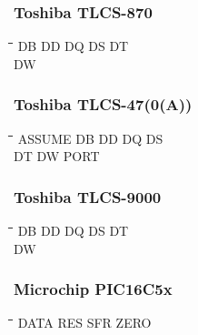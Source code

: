 \subsubsection{Toshiba TLCS-870}
{\tt\begin{tabbing}
\hspace{3cm}\=\hspace{3cm}\=\hspace{3cm}\=\hspace{3cm}\=\kill
DB         \> DD          \> DQ          \> DS          \> DT \\
DW \\
\end{tabbing}}

\subsubsection{Toshiba TLCS-47(0(A))}
{\tt\begin{tabbing}
\hspace{3cm}\=\hspace{3cm}\=\hspace{3cm}\=\hspace{3cm}\=\kill
ASSUME     \> DB          \> DD          \> DQ          \> DS \\
DT         \> DW          \> PORT \\
\end{tabbing}}

\subsubsection{Toshiba TLCS-9000}
{\tt\begin{tabbing}
\hspace{3cm}\=\hspace{3cm}\=\hspace{3cm}\=\hspace{3cm}\=\kill
DB         \> DD          \> DQ          \> DS          \> DT \\
DW \\
\end{tabbing}}

\subsubsection{Microchip PIC16C5x}
{\tt\begin{tabbing}
\hspace{3cm}\=\hspace{3cm}\=\hspace{3cm}\=\hspace{3cm}\=\kill
DATA       \> RES         \> SFR         \> ZERO \\
\end{tabbing}}

